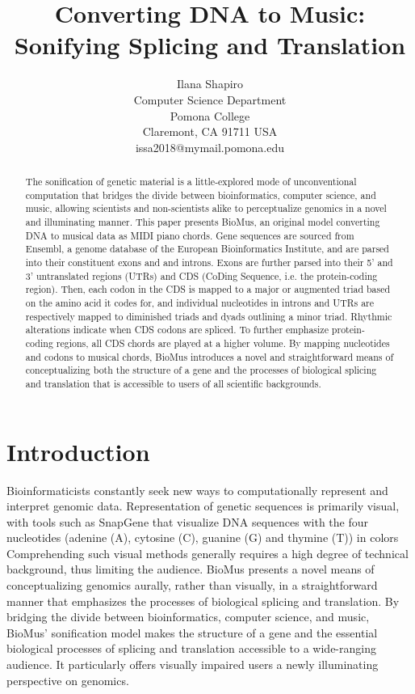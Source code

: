 \documentclass[letterpaper]{article}
\title{Converting DNA to Music: Sonifying Splicing and Translation}
\author{Ilana Shapiro\\
Computer Science Department\\
Pomona College\\
Claremont, CA 91711 USA\\
issa2018@mymail.pomona.edu\\
}
\begin{document}
 
\maketitle
\begin{abstract}
The sonification of genetic material is a little-explored mode of unconventional computation that bridges the divide between bioinformatics, computer science, and music, allowing scientists and non-scientists alike to perceptualize genomics in a novel and illuminating manner. This paper presents BioMus, an original model converting DNA to musical data as MIDI piano chords. Gene sequences are sourced from Ensembl, a genome database of the European Bioinformatics Institute, and are parsed into their constituent exons and and introns. Exons are further parsed into their 5’ and 3’ untranslated regions (UTRs) and CDS (CoDing Sequence,
i.e. the protein-coding region). Then, each codon in the CDS is mapped to a major or augmented triad based on the amino acid it codes for, and individual nucleotides in introns and UTRs are respectively mapped to diminished triads and dyads outlining a minor triad. Rhythmic alterations indicate when CDS codons are spliced. To further emphasize protein- coding regions, all CDS chords are played at a higher volume. By mapping nucleotides and codons to musical chords, BioMus introduces a novel and straightforward means of conceptualizing both the structure of a gene and the processes of biological splicing and translation that is accessible to users of all scientific backgrounds.

\end{abstract}

\section{Introduction}
Bioinformaticists constantly seek new ways to computationally represent and interpret genomic data. Representation of genetic sequences is primarily visual, with tools such as SnapGene that visualize DNA sequences with the four nucleotides (adenine (A), cytosine (C), guanine (G) and thymine (T)) in colors \cite{}
Comprehending such visual methods generally requires a high degree of technical background, thus limiting the audience. BioMus presents a novel means of conceptualizing genomics aurally, rather than visually, in a straightforward manner that emphasizes the processes of biological splicing and translation. By bridging the divide between bioinformatics, computer science, and music, BioMus’ sonification model makes the structure of a gene and the essential biological processes of splicing and translation accessible to a wide-ranging audience. It particularly offers visually impaired users a newly illuminating perspective on genomics.
\end{document}
